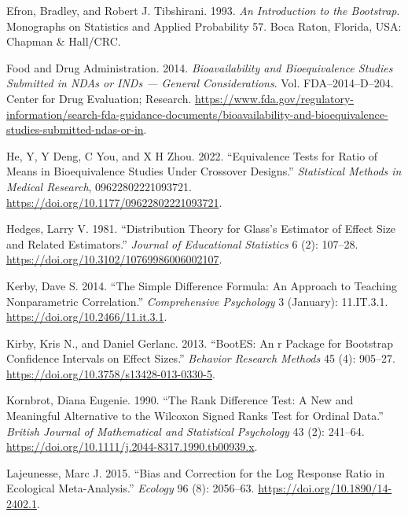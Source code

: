 \documentclass[
]{interact}
\newlength{\cslhangindent}
\newlength{\cslentryspacingunit} %
\newenvironment{CSLReferences}[2] %
 {%
  \setlength{\parindent}{0pt}
  \ifodd #1
  \let\oldpar\par
  \def\par{\hangindent=\cslhangindent\oldpar}
  \fi
  \setlength{\parskip}{#2\cslentryspacingunit}
 }%
 {}
\begin{document}
\begin{CSLReferences}{1}{0}
\leavevmode{}%
Efron, Bradley, and Robert J. Tibshirani. 1993. \emph{An Introduction to
the Bootstrap}. Monographs on Statistics and Applied Probability 57.
Boca Raton, Florida, USA: Chapman \& Hall/CRC.

\leavevmode{}%
Food and Drug Administration. 2014. \emph{Bioavailability and
Bioequivalence Studies Submitted in NDAs or INDs --- General
Considerations}. Vol. FDA--2014--D--204. Center for Drug Evaluation;
Research.
\url{https://www.fda.gov/regulatory-information/search-fda-guidance-documents/bioavailability-and-bioequivalence-studies-submitted-ndas-or-in}.

\leavevmode{}%
He, Y, Y Deng, C You, and X H Zhou. 2022. {``Equivalence Tests for Ratio
of Means in Bioequivalence Studies Under Crossover Designs.''}
\emph{Statistical Methods in Medical Research}, 09622802221093721.
\url{https://doi.org/10.1177/09622802221093721}.

\leavevmode{}%
Hedges, Larry V. 1981. {``Distribution Theory for Glass's Estimator of
Effect Size and Related Estimators.''} \emph{Journal of Educational
Statistics} 6 (2): 107--28.
\url{https://doi.org/10.3102/10769986006002107}.

\leavevmode{}%
Kerby, Dave S. 2014. {``The Simple Difference Formula: An Approach to
Teaching Nonparametric Correlation.''} \emph{Comprehensive Psychology} 3
(January): 11.IT.3.1. \url{https://doi.org/10.2466/11.it.3.1}.

\leavevmode{}%
Kirby, Kris N., and Daniel Gerlanc. 2013. {``{BootES}: An r Package for
Bootstrap Confidence Intervals on Effect Sizes.''} \emph{Behavior
Research Methods} 45 (4): 905--27.
\url{https://doi.org/10.3758/s13428-013-0330-5}.

\leavevmode{}%
Kornbrot, Diana Eugenie. 1990. {``The Rank Difference Test: A New and
Meaningful Alternative to the Wilcoxon Signed Ranks Test for Ordinal
Data.''} \emph{British Journal of Mathematical and Statistical
Psychology} 43 (2): 241--64.
\url{https://doi.org/10.1111/j.2044-8317.1990.tb00939.x}.

\leavevmode{}%
Lajeunesse, Marc J. 2015. {``Bias and Correction for the Log Response
Ratio in Ecological Meta-Analysis.''} \emph{Ecology} 96 (8): 2056--63.
\url{https://doi.org/10.1890/14-2402.1}.


\end{CSLReferences}
\end{document}
